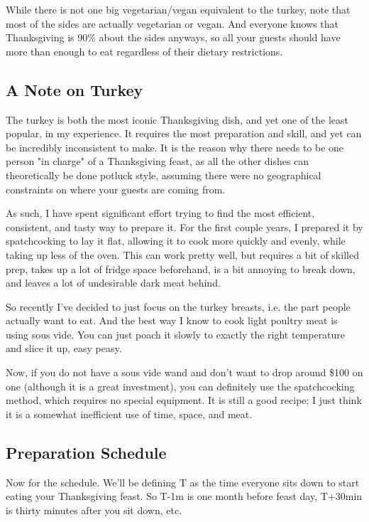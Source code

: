 \documentclass[12pt]{article}
\begin{document}
	While there is not one big vegetarian/vegan equivalent to the turkey, note that most of the sides are actually vegetarian or vegan. And everyone knows that Thanksgiving is 90\% about the sides anyways, so all your guests should have more than enough to eat regardless of their dietary restrictions.
	
	\subsection{A Note on Turkey}
	The turkey is both the most iconic Thanksgiving dish, and yet one of the least popular, in my experience. It requires the most preparation and skill, and yet can be incredibly inconsistent to make. It is the reason why there needs to be one person "in charge" of a Thanksgiving feast, as all the other dishes can theoretically be done potluck style, assuming there were no geographical constraints on where your guests are coming from.
	
	As such, I have spent significant effort trying to find the most efficient, consistent, and tasty way to prepare it. For the first couple years, I prepared it by spatchcocking to lay it flat, allowing it to cook more quickly and evenly, while taking up less of the oven. This can work pretty well, but requires a bit of skilled prep, takes up a lot of fridge space beforehand, is a bit annoying to break down, and leaves a lot of undesirable dark meat behind.
	
	So recently I've decided to just focus on the turkey breasts, i.e. the part people actually want to eat. And the best way I know to cook light poultry meat is using sous vide. You can just poach it slowly to exactly the right temperature and slice it up, easy peasy.
	
	Now, if you do not have a sous vide wand and don't want to drop around \$100 on one (although it is a great investment), you can definitely use the spatchcocking method, which requires no special equipment. It is still a good recipe; I just think it is a somewhat inefficient use of time, space, and meat.
	
	\subsection{Preparation Schedule}\label{sec:prep_schedule}
	Now for the schedule. We'll be defining T as the time everyone sits down to start eating your Thanksgiving feast. So T-1m is one month before feast day, T+30min is thirty minutes after you sit down, etc.
	
\end{document}
